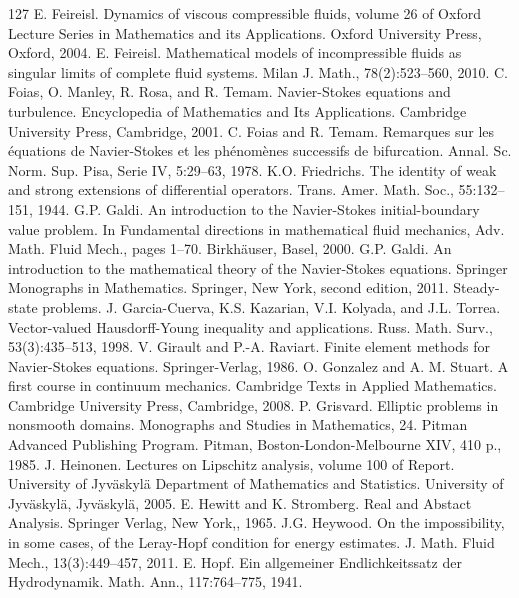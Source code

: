 \begin{thebibliography}{127}
 E. Feireisl. Dynamics of viscous compressible fluids, volume 26 of Oxford Lecture Series in Mathematics and its Applications. Oxford University Press, Oxford, 2004.
 E. Feireisl. Mathematical models of incompressible fluids as singular limits of complete fluid systems. Milan J. Math., 78(2):523–560, 2010.
 C. Foias, O. Manley, R. Rosa, and R. Temam. Navier-Stokes equations and turbulence. Encyclopedia of Mathematics and Its Applications. Cambridge University Press, Cambridge, 2001.
 C. Foias and R. Temam. Remarques sur les équations de Navier-Stokes et les phénomènes successifs de bifurcation. Annal. Sc. Norm. Sup. Pisa, Serie IV, 5:29–63, 1978.
 K.O. Friedrichs. The identity of weak and strong extensions of differential operators. Trans. Amer. Math. Soc., 55:132–151, 1944.
 G.P. Galdi. An introduction to the Navier-Stokes initial-boundary value problem. In Fundamental directions in mathematical fluid mechanics, Adv. Math. Fluid Mech., pages 1–70. Birkhäuser, Basel, 2000.
 G.P. Galdi. An introduction to the mathematical theory of the Navier-Stokes equations. Springer Monographs in Mathematics. Springer, New York, second edition, 2011. Steady-state problems.
 J. Garcia-Cuerva, K.S. Kazarian, V.I. Kolyada, and J.L. Torrea. Vector-valued Hausdorff-Young inequality and applications. Russ. Math. Surv., 53(3):435–513, 1998.
 V. Girault and P.-A. Raviart. Finite element methods for Navier-Stokes equations. Springer-Verlag, 1986.
 O. Gonzalez and A. M. Stuart. A first course in continuum mechanics. Cambridge Texts in Applied Mathematics. Cambridge University Press, Cambridge, 2008.
 P. Grisvard. Elliptic problems in nonsmooth domains. Monographs and Studies in Mathematics, 24. Pitman Advanced Publishing Program. Pitman, Boston-London-Melbourne XIV, 410 p., 1985.
 J. Heinonen. Lectures on Lipschitz analysis, volume 100 of Report. University of Jyväskylä Department of Mathematics and Statistics. University of Jyväskylä, Jyväskylä, 2005.
 E. Hewitt and K. Stromberg. Real and Abstact Analysis. Springer Verlag, New York,, 1965.
 J.G. Heywood. On the impossibility, in some cases, of the Leray-Hopf condition for energy estimates. J. Math. Fluid Mech., 13(3):449–457, 2011.
 E. Hopf. Ein allgemeiner Endlichkeitssatz der Hydrodynamik. Math. Ann., 117:764–775, 1941.

\end{thebibliography}
